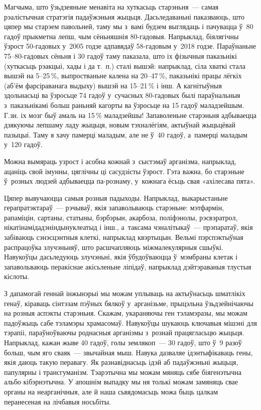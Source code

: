 Магчыма, што ўзьдзеяньне менавіта на хуткасьць старэньня~--- самая рэалістычная стратэгія падаўжэньня жыцьця. Дасьледаваньні паказваюць, што цяпер мы старэем павольней, таму мы з~вамі будзем выглядаць і пачувацца ў~80 гадоў прыкметна лепш, чым сёньняшнія 80-гадовыя. Напрыклад, біялягічны ўзрост 50-гадовых у~2005 годзе адпавядаў 58-гадовым у~2018 годзе. Параўнаньне 75--80-гадовых сёньня і 30 гадоў таму паказала, што іх фізычныя паказьнікі (хуткасьць рэакцыі, хады і да т.~п.) сталі вышэй: напрыклад, сіла хваткі стала вышэй на 5--25\,\%, выпростваньне калена на 20--47\,\%, паказьнікі працы лёгкіх (аб'ём фарсіраванага выдыху) вышэй на 15--21\,\% і інш. А кагнітыўныя здольнасьці ва ўзросьце 74 гадоў у~сучасных 80-гадовых былі параўнальныя з~паказьнікамі больш раньняй кагорты ва ўзросьце на 15 гадоў маладзейшым. Г.зн. іх мозг быў амаль на 15\,\% маладзейшы! Запаволеньне старэньня адбываецца дзякуючы лепшаму ладу жыцьця, новым тэхналёгіям, актыўнай жыцьцёвай пазыцыі. Таму я хачу памерці маладым, але не ў~40 гадоў, а~памерці маладым у~120 гадоў.

Можна вымяраць узрост і асобна кожнай з~сыстэмаў арганізма, напрыклад, ацаніць свой імунны, цяглічны ці сасудзісты ўзрост. Гэта важна, бо старэньне ў~розных людзей адбываецца па-рознаму, у~кожнага ёсьць свая «ахілесава пята».

Цяпер вывучаюцца самыя розныя падыходы. Напрыклад, выкарыстаньне герапратэктараў~--- рэчываў, якія запавольваюць старэньне: мэтфармін, рапаміцін, сартаны, статыны, бэрбэрын, акарбоза, поліфэнолы, рэсвэратрол, нікатінамідадэніндынуклеатыд і інш., а~таксама чэналітыкаў~--- прэпаратаў, якія забіваюць сэнэсцэнтныя клеткі, напрыклад квэртыцын. Вельмі пэрспэктыўная распрацоўка злучэньняў, што расшчапляюць міжмалекулярныя сшыўкі. Навукоўцы дасьледуюць злучэньні, якія ўбудоўваюцца ў~мэмбраны клетак і запавольваюць перакіснае акісьленьне ліпідаў, напрыклад дэйтэраваныя тлустыя кіслоты.

З дапамогай геннай інжынэрыі мы можам уплываць на актыўнасьць шматлікіх генаў, кіраваць сінтэзам пэўных бялкоў у~арганізьме, прыцэльна ўзьдзейнічаючы на розныя аспэкты старэньня. Скажам, укараняючы ген тэламэразы, мы можам падоўжыць сабе тэламэры храмасомаў. Навукоўцы шукаюць ключавыя мішэні для тэрапіі, параўноўваючы роднасныя арганізмы з~рознай працягласьцю жыцьця. Напрыклад, кажан жыве 40 гадоў, голы землякоп~--- 30 гадоў, што ў~9 разоў больш, чым яго сваяк~--- звычайная мыш. Навука дазваляе ідэнтыфікаваць гены, якія даюць такую перавагу. Як разнавіднасьць ідэй аб падаўжэньні жыцьця, папулярны і трансгуманізм. Тэарэтычна мы можам мяняць сябе біягенэтычна альбо кібэрнэтычна. У апошнім выпадку мы ня толькі можам замяняць свае органы на неарганічныя, але й наша сьвядомасьць можа быць цалкам перанесеная на лічбавыя носьбіты.

